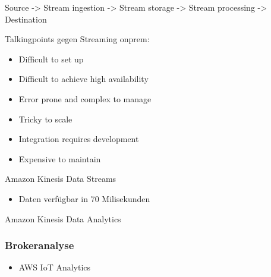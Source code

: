 Source -> Stream ingestion -> Stream storage -> Stream processing -> Destination

Talkingpoints gegen Streaming onprem:
\begin{itemize}
\item Difficult to set up
\item Difficult to achieve high availability
\item Error prone and complex to manage
\item Tricky to scale
\item Integration requires development
\item Expensive to maintain
\end{itemize}
Amazon Kinesis Data Streams 
\begin{itemize}
\item Daten verfügbar in 70 Milisekunden
\end{itemize}


Amazon Kinesis Data Analytics


\subsubsection{Brokeranalyse}

\begin{itemize}
\item AWS IoT Analytics
\end{itemize}